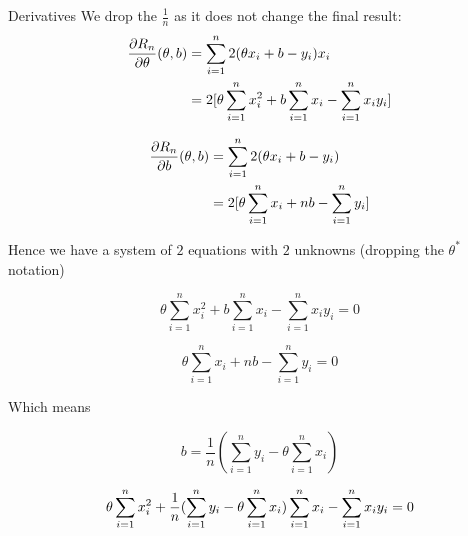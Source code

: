 \documentclass[usenames,dvipsnames,french]{beamer}
\begin{document}
\begin{frame}{Derivatives}
    We drop the  $\frac{1}{n}$ as it does not change the final result:
    \begin{equation}
    \begin{aligned}
        \label{eq:}
        \frac{\partial R_n}{\partial \theta}(\theta, b) &= \sum_{i=1}^{n} 2(\theta x_i+b-y_i)x_i\\
        &= 2\Large[\theta \sum_{i=1}^{n} x_i^2 + b\sum_{i=1}^{n} x_i - \sum_{i=1}^{n} x_i y_i \Large]\\
    \end{aligned}
    \end{equation}


    \begin{equation}
    \begin{aligned}
        \label{eq:}
        \frac{\partial R_n}{\partial b}(\theta, b) &= \sum_{i=1}^{n} 2(\theta x_i+b-y_i)\\
        &= 2\Large[\theta \sum_{i=1}^{n} x_i + nb- \sum_{i=1}^{n} y_i \Large]\\
    \end{aligned}
    \end{equation}
\end{frame}

\begin{frame}{}
    Hence we have a system of $2$ equations with $2$ unknowns (dropping the $\theta^*$ notation)

    \begin{equation}
        \theta \sum_{i=1}^{n} x_i^2 + b\sum_{i=1}^{n} x_i - \sum_{i=1}^{n} x_i y_i = 0
    \end{equation}

    \begin{equation}
        \theta \sum_{i=1}^{n} x_i + nb- \sum_{i=1}^{n} y_i = 0
    \end{equation}
\end{frame}

\begin{frame}{}
    Which means

    \begin{equation}
        b =  \frac{1}{n}(\sum_{i=1}^{n} y_i -\theta \sum_{i=1}^{n} x_i)
    \end{equation}

    \begin{equation}
        \theta \sum_{i=1}^{n} x_i^2 + \frac{1}{n}\large(\sum_{i=1}^{n} y_i -\theta \sum_{i=1}^{n} x_i \large)\sum_{i=1}^{n} x_i - \sum_{i=1}^{n} x_i y_i = 0
    \end{equation}

\end{frame}
\end{document}
